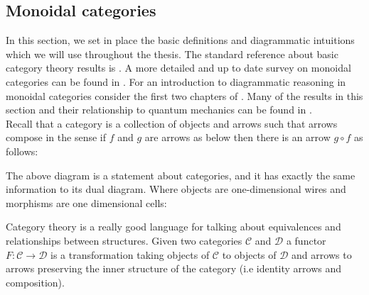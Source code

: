\documentclass{article}
\begin{document}
\subsection{Monoidal categories}
In this section, we set in place the basic definitions and diagrammatic  intuitions which we will use throughout the thesis. The standard reference about basic category theory results is \cite{MacLane71}. A more detailed and up to date survey on monoidal categories can be found in \cite{Etingof15}. For an introduction to diagrammatic reasoning in monoidal categories consider the first two chapters of \cite{Coecke17}. Many of the results in this section and their relationship to quantum mechanics can be found in \cite{Vicary12}. \\
Recall that a category is a collection of objects and arrows such that arrows compose in the sense if $f$ and $g$ are arrows as below then there is an arrow $g \circ f$ as follows: 	
\begin{center}
\end{center}
The above diagram is a statement about categories, and it has exactly the same information to its dual diagram. Where objects are one-dimensional wires and morphisms are one dimensional cells:
\begin{center}
\end{center}
Category theory is a really good language for talking about equivalences and relationships between structures.
Given two categories $\mathcal{C}$ and $\mathcal{D}$ a functor $F: \mathcal{C} \rightarrow \mathcal{D}$ is a transformation taking objects of $\mathcal{C}$ to objects of $\mathcal{D}$ and arrows to arrows preserving the inner structure of the category (i.e identity arrows and composition).
\end{document}
